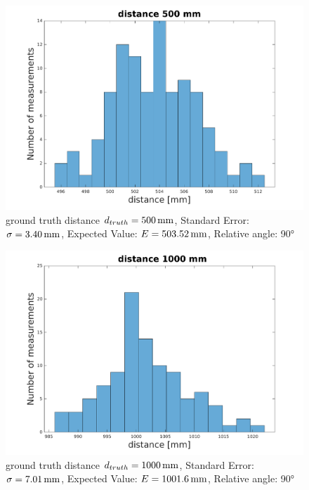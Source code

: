 \begin{figure}
	\centering
	\includegraphics[width=0.9\linewidth]{pictures/plot_dist500.pdf}
	\caption{ground truth distance $d_{truth}= \unit[500]{mm}$, Standard Error: $\sigma=\unit[3.40]{mm}$, Expected Value: $E=\unit[503.52]{mm}$, Relative angle: 90°}
	\label{fig:dist500}
\end{figure}

\begin{figure}
	\centering
	\includegraphics[width=0.9\linewidth]{pictures/plot_dist1000.pdf}
	\caption{ground truth distance $d_{truth}= \unit[1000]{mm}$, Standard Error: $\sigma=\unit[7.01]{mm}$, Expected Value: $E=\unit[1001.6]{mm}$, Relative angle: 90°}
	\label{fig:dist1000}
\end{figure}

